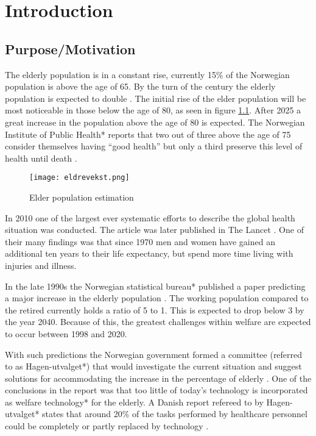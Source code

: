 
\chapter{Introduction} %

\label{Chapter1} %


\section{Purpose/Motivation}
The elderly population is in a constant rise, currently 15\% of the Norwegian population is above the age of 65. By the turn of the century the elderly population is expected to double \cite{elder}. The initial rise of the elder population will be most noticeable in those below the age of 80, as seen in figure \ref{fig:elderPopulation}. After 2025 a great increase in the population above the age of 80 is expected. The Norwegian Institute of Public Health* reports that two out of three above the age of 75 consider themselves having ``good health'' but only a third preserve this level of health until death \cite{elder}.

\begin{figure}[h!]
	\centering	
		\texttt{[image: eldrevekst.png]}
		\caption{\footnotesize Elder population estimation \cite{elder}}
		\label{fig:elderPopulation}
\end{figure}
In 2010 one of the largest ever systematic efforts to describe the global health situation was conducted. The article was later published in The Lancet \cite{globalBurden}. One of their many findings was that since 1970 men and women have gained an additional ten years to their life expectancy, but spend more time living with injuries and illness. %

In the late 1990s the Norwegian statistical bureau* published a paper predicting a major increase in the elderly population \cite{eldreEksplosjon}. The working population compared to the retired currently holds a ratio of 5 to 1. This is expected to drop below 3 by the year 2040. Because of this, the greatest challenges within welfare are expected to occur between 1998 and 2020. 

With such predictions the Norwegian government formed a committee (referred to as Hagen-utvalget*) that would investigate the current situation and suggest solutions for accommodating the increase in the percentage of elderly \cite{haagen}. One of the conclusions in the report was that too little of today's technology is incorporated as welfare technology* for the elderly. A Danish report refereed to by Hagen-utvalget* states that around 20\% of the tasks performed by healthcare personnel could be completely or partly replaced by technology \cite{kmd}. 

